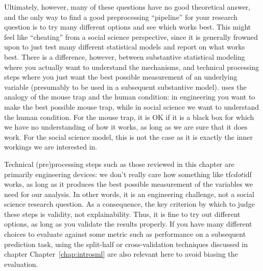 Ultimately, however, many of these questions have no good theoretical answer, and the only way to find a good preprocessing ``pipeline'' for your research question is to try many different
options and see which works best.
This might feel like ``cheating'' from a social science perspective, since it is generally frowned upon to just test many different statistical models and report on what works best.
There is a difference, however, between substantive statistical modeling where you actually want to understand the mechanisms,
and technical processing steps where you just want the best possible measurement of an underlying variable (presumably to be used in a subsequent substantive model).
\citet{mousetrap} uses the analogy of the mouse trap and the human condition: in engineering you want to make the best possible mouse trap,
while in social science we want to understand the human condition.
For the mouse trap, it is OK if it is a black box for which we have no understanding of how it works, as long as we are sure that it does work.
For the social science model, this is not the case as it is exactly the inner workings we are interested in.

Technical (pre)processing steps such as those reviewed in this chapter are primarily engineering devices:
we don't really care how something like tf$cdot$idf works, as long as it produces the best possible measurement of the variables we need for our analysis.
In other words, it is an engineering challenge, not a social science research question.
As a consequence, the key criterion by which to judge these steps is validity, not explainability.
Thus, it is fine to try out different options, as long as you validate the results properly.
If you have many different choices to evaluate against some metric such as performance on a subsequent prediction task,
using the split-half or cross-validation techniques discussed in chapter Chapter~\ref{chap:introsml} are also relevant here to avoid biasing the evaluation.

